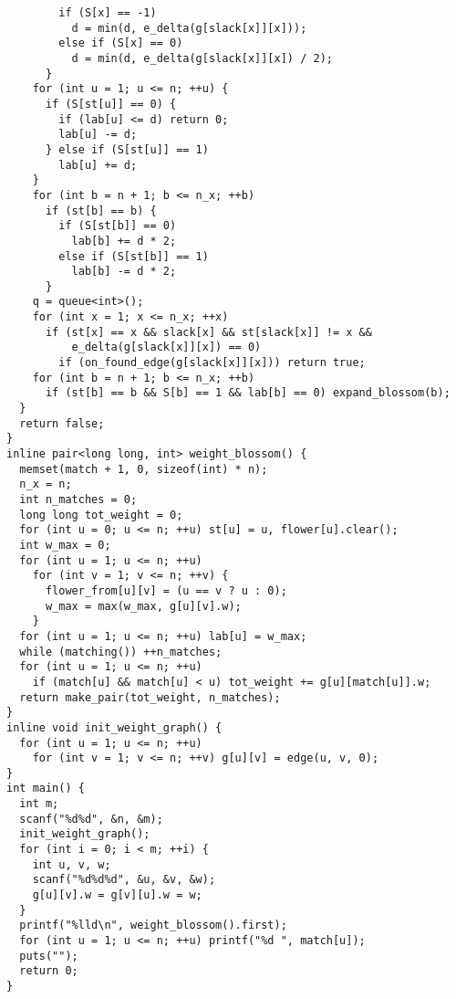 \begin{lstlisting}
        if (S[x] == -1)
          d = min(d, e_delta(g[slack[x]][x]));
        else if (S[x] == 0)
          d = min(d, e_delta(g[slack[x]][x]) / 2);
      }
    for (int u = 1; u <= n; ++u) {
      if (S[st[u]] == 0) {
        if (lab[u] <= d) return 0;
        lab[u] -= d;
      } else if (S[st[u]] == 1)
        lab[u] += d;
    }
    for (int b = n + 1; b <= n_x; ++b)
      if (st[b] == b) {
        if (S[st[b]] == 0)
          lab[b] += d * 2;
        else if (S[st[b]] == 1)
          lab[b] -= d * 2;
      }
    q = queue<int>();
    for (int x = 1; x <= n_x; ++x)
      if (st[x] == x && slack[x] && st[slack[x]] != x &&
          e_delta(g[slack[x]][x]) == 0)
        if (on_found_edge(g[slack[x]][x])) return true;
    for (int b = n + 1; b <= n_x; ++b)
      if (st[b] == b && S[b] == 1 && lab[b] == 0) expand_blossom(b);
  }
  return false;
}
inline pair<long long, int> weight_blossom() {
  memset(match + 1, 0, sizeof(int) * n);
  n_x = n;
  int n_matches = 0;
  long long tot_weight = 0;
  for (int u = 0; u <= n; ++u) st[u] = u, flower[u].clear();
  int w_max = 0;
  for (int u = 1; u <= n; ++u)
    for (int v = 1; v <= n; ++v) {
      flower_from[u][v] = (u == v ? u : 0);
      w_max = max(w_max, g[u][v].w);
    }
  for (int u = 1; u <= n; ++u) lab[u] = w_max;
  while (matching()) ++n_matches;
  for (int u = 1; u <= n; ++u)
    if (match[u] && match[u] < u) tot_weight += g[u][match[u]].w;
  return make_pair(tot_weight, n_matches);
}
inline void init_weight_graph() {
  for (int u = 1; u <= n; ++u)
    for (int v = 1; v <= n; ++v) g[u][v] = edge(u, v, 0);
}
int main() {
  int m;
  scanf("%d%d", &n, &m);
  init_weight_graph();
  for (int i = 0; i < m; ++i) {
    int u, v, w;
    scanf("%d%d%d", &u, &v, &w);
    g[u][v].w = g[v][u].w = w;
  }
  printf("%lld\n", weight_blossom().first);
  for (int u = 1; u <= n; ++u) printf("%d ", match[u]);
  puts("");
  return 0;
}

\end{lstlisting}